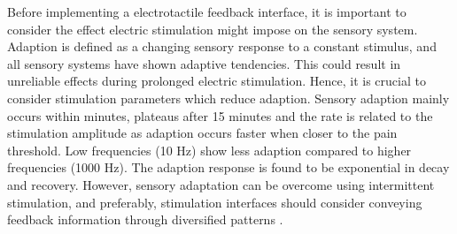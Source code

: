 Before implementing a electrotactile feedback interface, it is important to consider the effect electric stimulation might impose on the sensory system. \\
Adaption is defined as a changing sensory response to a constant stimulus, and all sensory systems have shown adaptive tendencies. This could result in unreliable effects during prolonged electric stimulation. Hence, it is crucial to consider stimulation parameters which reduce adaption. Sensory adaption mainly occurs within minutes, plateaus after 15 minutes and the rate is related to the stimulation amplitude as adaption occurs faster when closer to the pain threshold. Low frequencies (10 Hz) show less adaption compared to higher frequencies (1000 Hz). The adaption response is found to be exponential in decay and recovery. \cite{Buma2007,Szeto1982} 
However, sensory adaptation can be overcome using intermittent stimulation, and preferably, stimulation interfaces should consider conveying feedback information through diversified patterns \cite{Szeto1982,Dosen2016}. 


